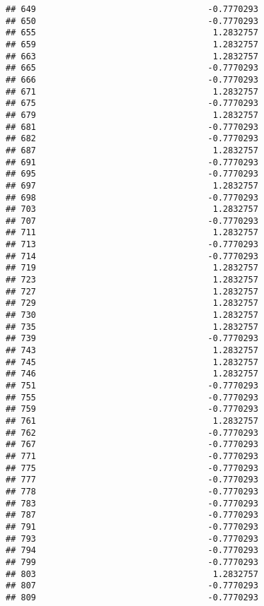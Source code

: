 \documentclass[
]{article}
\begin{document}
\begin{verbatim}
## 649                                  -0.7770293
## 650                                  -0.7770293
## 655                                   1.2832757
## 659                                   1.2832757
## 663                                   1.2832757
## 665                                  -0.7770293
## 666                                  -0.7770293
## 671                                   1.2832757
## 675                                  -0.7770293
## 679                                   1.2832757
## 681                                  -0.7770293
## 682                                  -0.7770293
## 687                                   1.2832757
## 691                                  -0.7770293
## 695                                  -0.7770293
## 697                                   1.2832757
## 698                                  -0.7770293
## 703                                   1.2832757
## 707                                  -0.7770293
## 711                                   1.2832757
## 713                                  -0.7770293
## 714                                  -0.7770293
## 719                                   1.2832757
## 723                                   1.2832757
## 727                                   1.2832757
## 729                                   1.2832757
## 730                                   1.2832757
## 735                                   1.2832757
## 739                                  -0.7770293
## 743                                   1.2832757
## 745                                   1.2832757
## 746                                   1.2832757
## 751                                  -0.7770293
## 755                                  -0.7770293
## 759                                  -0.7770293
## 761                                   1.2832757
## 762                                  -0.7770293
## 767                                  -0.7770293
## 771                                  -0.7770293
## 775                                  -0.7770293
## 777                                  -0.7770293
## 778                                  -0.7770293
## 783                                  -0.7770293
## 787                                  -0.7770293
## 791                                  -0.7770293
## 793                                  -0.7770293
## 794                                  -0.7770293
## 799                                  -0.7770293
## 803                                   1.2832757
## 807                                  -0.7770293
## 809                                  -0.7770293

\end{verbatim}
\end{document}
